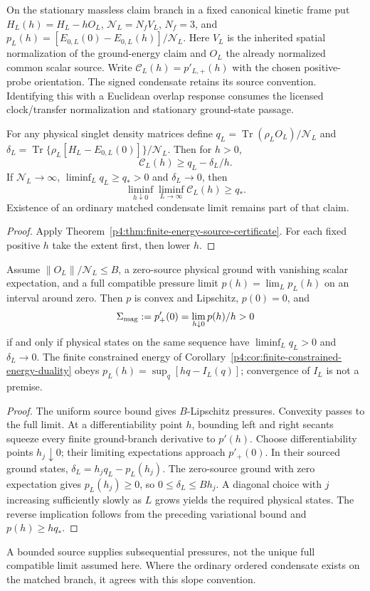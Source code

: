 \documentclass[12pt,a4paper]{article}
\begin{document}
On the stationary massless claim branch in a fixed canonical kinetic
frame put $H_L(h)=H_L-hO_L$, $\mathcal N_L=N_fV_L$, $N_f=3$,
and $p_L(h)=[E_{0,L}(0)-E_{0,L}(h)]/\mathcal N_L$.
Here $V_L$ is the inherited spatial normalization of the ground-energy
claim and $O_L$ the already normalized common scalar source.
Write $\mathcal C_L(h)=p'_{L,+}(h)$ with the chosen positive-probe
orientation. The signed condensate retains its source convention.
Identifying this with a Euclidean overlap response consumes the licensed
clock/transfer normalization and stationary ground-state passage.

\begin{theorem}
\label{p10:thm:chiral-energy-source-certificate}
For any physical singlet density matrices define
$q_L=\operatorname{Tr}(\rho_LO_L)/\mathcal N_L$ and
$\delta_L=\operatorname{Tr}\{\rho_L[H_L-E_{0,L}(0)]\}/\mathcal N_L$.
Then for $h>0$,
\[
 \mathcal C_L(h)\ge q_L-\delta_L/h.
\]
If $\mathcal N_L\to\infty$, $\liminf_Lq_L\ge q_*>0$ and
$\delta_L\to0$, then
\[
 \boxed{\liminf_{h\downarrow0}\liminf_{L\to\infty}
             \mathcal C_L(h)\ge q_*.}
\]
Existence of an ordinary matched condensate limit remains part of that claim.
\end{theorem}
\begin{proof}
Apply Theorem~\ref{p4:thm:finite-energy-source-certificate}.
For each fixed positive $h$ take the extent first, then lower $h$.
\end{proof}

\begin{theorem}
\label{p10:thm:chiral-pressure-energy-equivalence}
Assume $\|O_L\|/\mathcal N_L\le B$, a zero-source physical ground with
vanishing scalar expectation, and a full compatible pressure limit
$p(h)=\lim_Lp_L(h)$ on an interval around zero. Then $p$ is convex
and Lipschitz, $p(0)=0$, and
\[
 \Sigma_{\rm mag}:=p'_+(0)=\lim_{h\downarrow0}p(h)/h>0
\]
if and only if physical states on the same sequence have
$\liminf_Lq_L>0$ and $\delta_L\to0$.
The finite constrained energy of
Corollary~\ref{p4:cor:finite-constrained-energy-duality} obeys
$p_L(h)=\sup_q[hq-I_L(q)]$; convergence of $I_L$ is not a premise.
\end{theorem}
\begin{proof}
The uniform source bound gives $B$-Lipschitz pressures. Convexity
passes to the full limit. At a differentiability point $h$, bounding
left and right secants squeeze every finite ground-branch derivative
to $p'(h)$. Choose differentiability points $h_j\downarrow0$;
their limiting expectations approach $p'_+(0)$. In their sourced
ground states,
$\delta_L=h_jq_L-p_L(h_j)$.
The zero-source ground with zero expectation gives $p_L(h_j)\ge0$,
so $0\le\delta_L\le Bh_j$. A diagonal choice with $j$ increasing
sufficiently slowly as $L$ grows yields the required physical states.
The reverse implication follows from the preceding variational bound
and $p(h)\ge hq_*$.
\end{proof}
A bounded source supplies subsequential pressures, not the unique full
compatible limit assumed here. Where the ordinary ordered condensate
exists on the matched branch, it agrees with this slope convention.
\end{document}
